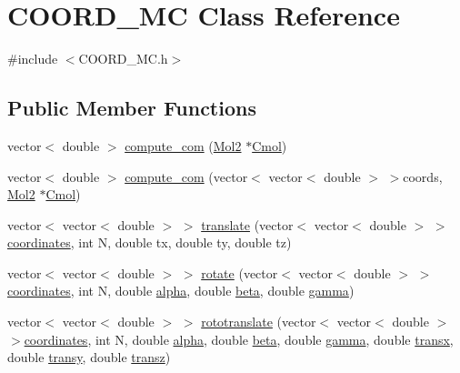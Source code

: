\hypertarget{classCOORD__MC}{
\section{COORD\_\-MC Class Reference}
\label{classCOORD__MC}
}


{\ttfamily \#include $<$COORD\_\-MC.h$>$}\subsection*{Public Member Functions}
\begin{DoxyCompactItemize}
\item 
vector$<$ double $>$ \hyperlink{classCOORD__MC_add97b29900401a44464b400267076544}{compute\_\-com} (\hyperlink{classMol2}{Mol2} $\ast$\hyperlink{classCOORD__MC_abdacaab2b3fca9018229d3ec220cf39d}{Cmol})
\item 
vector$<$ double $>$ \hyperlink{classCOORD__MC_ac77f14f3b04611c7bf46915a53792116}{compute\_\-com} (vector$<$ vector$<$ double $>$ $>$coords, \hyperlink{classMol2}{Mol2} $\ast$\hyperlink{classCOORD__MC_abdacaab2b3fca9018229d3ec220cf39d}{Cmol})
\item 
vector$<$ vector$<$ double $>$ $>$ \hyperlink{classCOORD__MC_aac39d2abe16a2f0b6015c4e69fb11753}{translate} (vector$<$ vector$<$ double $>$ $>$\hyperlink{classCOORD__MC_ad57a46a39d0a10f664128225e24bf99f}{coordinates}, int N, double tx, double ty, double tz)
\item 
vector$<$ vector$<$ double $>$ $>$ \hyperlink{classCOORD__MC_a79d104dc9fd9c0d6b52387c01cbac576}{rotate} (vector$<$ vector$<$ double $>$ $>$\hyperlink{classCOORD__MC_ad57a46a39d0a10f664128225e24bf99f}{coordinates}, int N, double \hyperlink{classCOORD__MC_a80872e7f1fedc71b060472be6565e83a}{alpha}, double \hyperlink{classCOORD__MC_a60fa21206cc164282a8d7b4e45b322c2}{beta}, double \hyperlink{classCOORD__MC_a67fa08c5c5dddf4cf3b5d01789124892}{gamma})
\item 
vector$<$ vector$<$ double $>$ $>$ \hyperlink{classCOORD__MC_ad5f14a1e75608fa9309c76337e5b38a7}{rototranslate} (vector$<$ vector$<$ double $>$ $>$\hyperlink{classCOORD__MC_ad57a46a39d0a10f664128225e24bf99f}{coordinates}, int N, double \hyperlink{classCOORD__MC_a80872e7f1fedc71b060472be6565e83a}{alpha}, double \hyperlink{classCOORD__MC_a60fa21206cc164282a8d7b4e45b322c2}{beta}, double \hyperlink{classCOORD__MC_a67fa08c5c5dddf4cf3b5d01789124892}{gamma}, double \hyperlink{classCOORD__MC_acc43aa187cde8621749a6297895906b5}{transx}, double \hyperlink{classCOORD__MC_abcea4fc50769038aa68487317f07d208}{transy}, double \hyperlink{classCOORD__MC_ae6a278f635288d901a8d00a512ab481b}{transz})

\end{DoxyCompactItemize}
